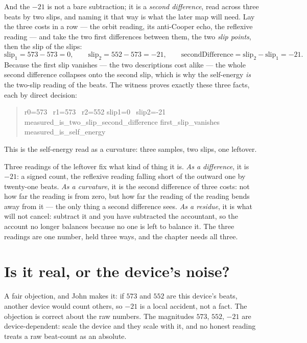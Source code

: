And the $-21$ is not a bare subtraction; it is a \emph{second difference}, read across three beats by two slips, and
naming it that way is what the later map will need.
Lay the three costs in a row --- the orbit reading, its anti-Cooper echo, the reflexive reading --- and take the two
first differences between them, the two \emph{slip points}, then the slip of the slips:
\[
  \text{slip}_1 = 573 - 573 = 0, \qquad \text{slip}_2 = 552 - 573 = -21, \qquad
  \text{secondDifference} = \text{slip}_2 - \text{slip}_1 = -21 .
\]
Because the first slip vanishes --- the two descriptions cost alike --- the whole second difference collapses onto the
second slip, which is why the self-energy \emph{is} the two-slip reading of the beats.
The witness proves exactly these three facts, each by direct decision:
\begin{quote}\ttfamily
r0=573 \ r1=573 \ r2=552 \qquad slip1=0 \ slip2=-21\\
measured\_is\_two\_slip\_second\_difference \quad first\_slip\_vanishes \quad measured\_is\_self\_energy
\end{quote}
This is the self-energy read as a curvature: three samples, two slips, one leftover.

Three readings of the leftover fix what kind of thing it is.
\emph{As a difference}, it is $-21$: a signed count, the reflexive reading falling short of the outward one by
twenty-one beats.
\emph{As a curvature}, it is the second difference of three costs: not how far the reading is from zero, but how far the
reading of the reading bends away from it --- the only thing a second difference sees.
\emph{As a residue}, it is what will not cancel: subtract it and you have subtracted the accountant, so the account no
longer balances because no one is left to balance it.
The three readings are one number, held three ways, and the chapter needs all three.

\section{Is it real, or the device's noise?}

A fair objection, and John makes it: if $573$ and $552$ are this device's beats, another device would count others,
so $-21$ is a local accident, not a fact.
The objection is correct about the raw numbers.
The magnitudes $573$, $552$, $-21$ are device-dependent: scale the device and they scale with it, and no honest
reading treats a raw beat-count as an absolute.

